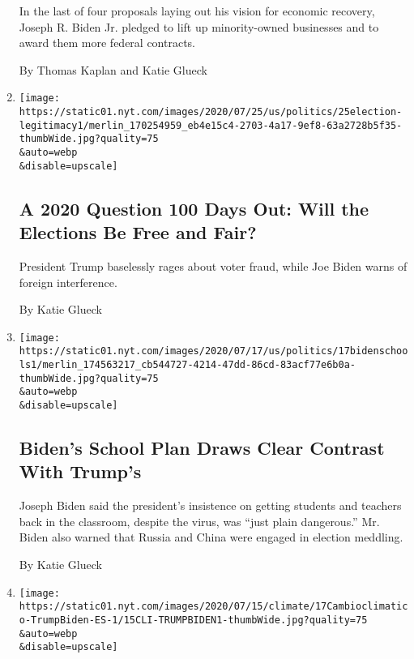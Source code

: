 \begin{enumerate}
  In the last of four proposals laying out his vision for economic
  recovery, Joseph R. Biden Jr. pledged to lift up minority-owned
  businesses and to award them more federal contracts.

  By Thomas Kaplan and Katie Glueck
\item
  \href{/2020/07/25/us/politics/2020-election-voter-fraud-interference.html}{}

  \texttt{[image: https://static01.nyt.com/images/2020/07/25/us/politics/25election-legitimacy1/merlin\_170254959\_eb4e15c4-2703-4a17-9ef8-63a2728b5f35-thumbWide.jpg?quality=75\\\&auto=webp\\\&disable=upscale]}

  \hypertarget{a-2020-question-100-days-out-will-the-elections-be-free-and-fair}{%
  \subsection{A 2020 Question 100 Days Out: Will the Elections Be Free
  and
  Fair?}\label{a-2020-question-100-days-out-will-the-elections-be-free-and-fair}}

  President Trump baselessly rages about voter fraud, while Joe Biden
  warns of foreign interference.

  By Katie Glueck
\item
  \href{/2020/07/17/us/politics/biden-schools-reopening.html}{}

  \texttt{[image: https://static01.nyt.com/images/2020/07/17/us/politics/17bidenschools1/merlin\_174563217\_cb544727-4214-47dd-86cd-83acf77e6b0a-thumbWide.jpg?quality=75\\\&auto=webp\\\&disable=upscale]}

  \hypertarget{bidens-school-plan-draws-clear-contrast-with-trumps}{%
  \subsection{Biden's School Plan Draws Clear Contrast With
  Trump's}\label{bidens-school-plan-draws-clear-contrast-with-trumps}}

  Joseph Biden said the president's insistence on getting students and
  teachers back in the classroom, despite the virus, was ``just plain
  dangerous.'' Mr. Biden also warned that Russia and China were engaged
  in election meddling.

  By Katie Glueck
\item
  \href{/es/2020/07/17/espanol/estados-unidos/cambio-climatico-trump-biden.html}{}

  \texttt{[image: https://static01.nyt.com/images/2020/07/15/climate/17Cambioclimatico-TrumpBiden-ES-1/15CLI-TRUMPBIDEN1-thumbWide.jpg?quality=75\\\&auto=webp\\\&disable=upscale]}


\end{enumerate}
